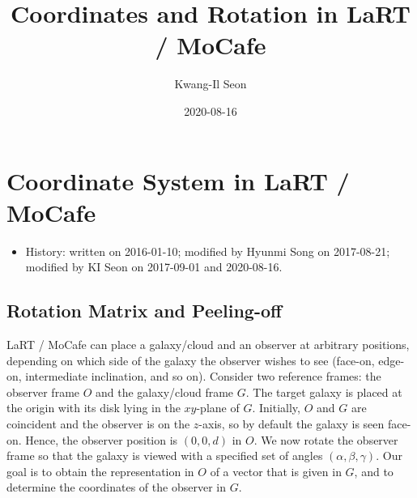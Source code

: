 \documentclass[english,a4paper]{my_memo}
\begin{document}
\title{Coordinates and Rotation in LaRT / MoCafe}
\author{Kwang-Il Seon}
\date{2020-08-16}
\maketitle

\tableofcontents
\bigskip

\section{Coordinate System in LaRT / MoCafe}
\begin{itemize}
\item History: written on 2016-01-10; modified by Hyunmi Song on 2017-08-21;
  modified by KI Seon on 2017-09-01 and 2020-08-16.
\end{itemize}

\subsection{Rotation Matrix and Peeling-off}

LaRT / MoCafe can place a galaxy/cloud and an observer at arbitrary
positions, depending on which side of the galaxy the observer wishes
to see (face-on, edge-on, intermediate inclination, and so on).
Consider two reference frames: the observer frame $O$ and the
galaxy/cloud frame $G$. The target galaxy is placed at the origin
with its disk lying in the $xy$-plane of $G$. Initially, $O$ and $G$
are coincident and the observer is on the $z$-axis, so by default
the galaxy is seen face-on. Hence, the observer position is
$(0,0,d)$ in $O$. We now rotate the observer frame so that the
galaxy is viewed with a specified set of angles
$(\alpha, \beta, \gamma)$. Our goal is to obtain the representation
in $O$ of a vector that is given in $G$, and to determine the
coordinates of the observer in $G$.
\end{document}
